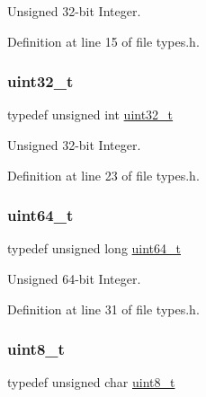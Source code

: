 Unsigned 32-\/bit Integer. 



Definition at line 15 of file types.\+h.

\mbox{\label{a00047_a435d1572bf3f880d55459d9805097f62_a435d1572bf3f880d55459d9805097f62}} 
\subsubsection{\texorpdfstring{uint32\+\_\+t}{uint32\_t}}
{\footnotesize\ttfamily typedef unsigned int \hyperlink{a00047_a435d1572bf3f880d55459d9805097f62_a435d1572bf3f880d55459d9805097f62}{uint32\+\_\+t}}



Unsigned 32-\/bit Integer. 



Definition at line 23 of file types.\+h.

\mbox{\label{a00047_aa232ecf786a74ce5363c36c10798d2b1_aa232ecf786a74ce5363c36c10798d2b1}} 
\subsubsection{\texorpdfstring{uint64\+\_\+t}{uint64\_t}}
{\footnotesize\ttfamily typedef unsigned long \hyperlink{a00047_aa232ecf786a74ce5363c36c10798d2b1_aa232ecf786a74ce5363c36c10798d2b1}{uint64\+\_\+t}}



Unsigned 64-\/bit Integer. 



Definition at line 31 of file types.\+h.

\mbox{\label{a00047_aba7bc1797add20fe3efdf37ced1182c5_aba7bc1797add20fe3efdf37ced1182c5}} 
\subsubsection{\texorpdfstring{uint8\+\_\+t}{uint8\_t}}
{\footnotesize\ttfamily typedef unsigned char \hyperlink{a00047_aba7bc1797add20fe3efdf37ced1182c5_aba7bc1797add20fe3efdf37ced1182c5}{uint8\+\_\+t}}



